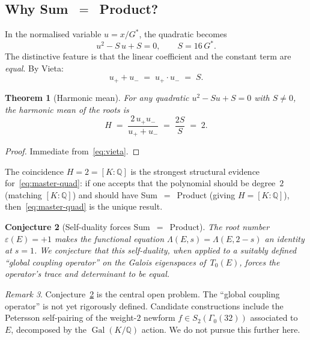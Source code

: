 \documentclass[12pt,reqno]{amsart}
\newtheorem{theorem}{Theorem}[section]
\newtheorem{conjecture}[theorem]{Conjecture}
\theoremstyle{definition}
\theoremstyle{remark}
\newtheorem{remark}[theorem]{Remark}
\newcommand{\QQ}{\mathbb{Q}}
\newcommand{\Gstar}{G^{\!*}}
\begin{document}
\subsection{Why Sum~\texorpdfstring{$=$}{=}~Product?}\label{ssec:sep}

In the normalised variable $u = x/\Gstar$, the quadratic becomes
\begin{equation}\label{eq:norm-quad}
  u^{2} - S\,u + S = 0, \qquad S = 16\,\Gstar.
\end{equation}
The distinctive feature is that the linear coefficient and the constant term
are \emph{equal}.  By Vieta:
\begin{equation}\label{eq:vieta}
  u_{+}+u_{-} \;=\; u_{+}\cdot u_{-} \;=\; S.
\end{equation}

\begin{theorem}[Harmonic mean]\label{thm:harmonic}
For any quadratic $u^{2}-Su+S=0$ with $S\neq 0$, the harmonic mean of the
roots is
\begin{equation}\label{eq:harmonic}
  H \;=\; \frac{2\,u_{+}u_{-}}{u_{+}+u_{-}}
  \;=\; \frac{2S}{S} \;=\; 2.
\end{equation}
\end{theorem}

\begin{proof}
Immediate from~\eqref{eq:vieta}.
\end{proof}

The coincidence $H = 2 = [K:\QQ]$ is the strongest structural evidence
for~\eqref{eq:master-quad}: if one accepts that the polynomial should be
degree~$2$ (matching $[K:\QQ]$) and should have Sum~$=$~Product (giving
$H=[K:\QQ]$), then~\eqref{eq:master-quad} is the unique result.

\begin{conjecture}[Self-duality forces Sum~$=$~Product]\label{conj:TrN}
The root number $\varepsilon(E)=+1$ makes the functional equation
$\Lambda(E,s)=\Lambda(E,2-s)$ an identity at $s=1$.  We conjecture that this
self-duality, when applied to a suitably defined ``global coupling operator''
on the Galois eigenspaces of~$T_{0}(E)$, forces the operator's trace and
determinant to be equal.
\end{conjecture}

\begin{remark}\label{rem:gap}
Conjecture~\ref{conj:TrN} is the central open problem.
The ``global coupling operator'' is not yet rigorously defined.  Candidate
constructions include the Petersson self-pairing of the weight-$2$ newform
$f\in S_{2}(\Gamma_{0}(32))$ associated to~$E$, decomposed by the
$\operatorname{Gal}(K/\QQ)$ action.  We do not pursue this further here.
\end{remark}
\end{document}
